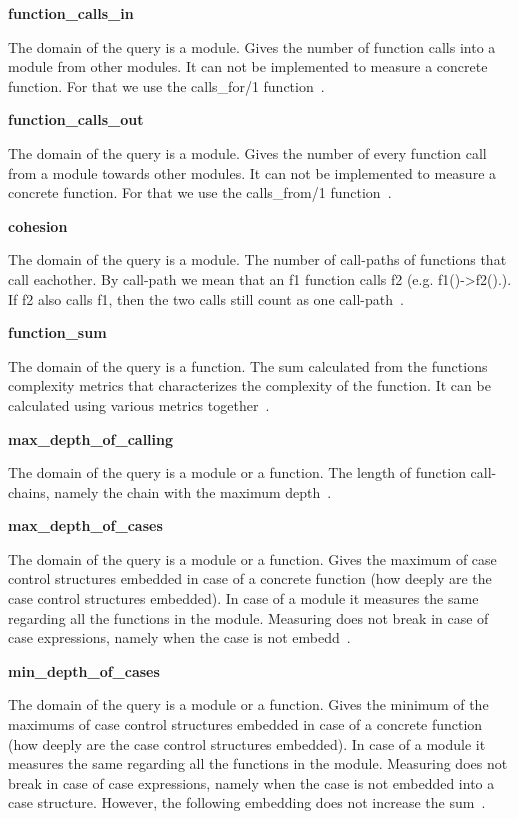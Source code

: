 \textbf{function\_calls\_in}

The domain of the query is a module. Gives the number of function calls into a module from other modules. It can not be implemented to measure a concrete function. For that we use the calls\_for/1 function~\cite{refactorerl}.

\textbf{function\_calls\_out}

The domain of the query is a module. Gives the number of every function call from a module towards other modules. It can not be implemented to measure a concrete function. For that we use the calls\_from/1 function~\cite{refactorerl}.

\textbf{cohesion}

The domain of the query is a module. The number of call-paths of functions that call eachother. By call-path we mean that an f1 function calls f2 (e.g. f1()->f2().). If f2 also calls f1, then the two calls still count as one call-path~\cite{refactorerl}.

\textbf{function\_sum}

The domain of the query is a function. The sum calculated from the functions complexity metrics that characterizes the complexity of the function. It can be calculated using various metrics together~\cite{refactorerl}.
	 
\textbf{max\_depth\_of\_calling}

The domain of the query is a module or a function. The length of function call-chains, namely the chain with the maximum depth~\cite{refactorerl}.
	 
\textbf{max\_depth\_of\_cases}

The domain of the query is a module or a function. Gives the maximum of case control structures embedded in case of a concrete function (how deeply are the case control structures embedded). In case of a module it measures the same regarding all the functions in the module. Measuring does not break in case of case expressions, namely when the case is not embedd~\cite{refactorerl}.

\textbf{min\_depth\_of\_cases}

The domain of the query is a module or a function. Gives the minimum of the maximums of case control structures embedded in case of a concrete function (how deeply are the case control structures embedded). In case of a module it measures the same regarding all the functions in the module. Measuring does not break in case of case expressions, namely when the case is not embedded into a case structure. However, the following embedding does not increase the sum~\cite{refactorerl}.

